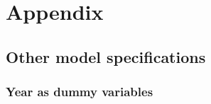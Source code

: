 \documentclass[11pt,]{article}
\begin{document}
\clearpage

\hypertarget{appendix}{%
\section{Appendix}\label{appendix}}

\hypertarget{other-model-specifications}{%
\subsection{Other model
specifications}\label{other-model-specifications}}

\hypertarget{year-as-dummy-variables}{%
\subsubsection{Year as dummy variables}\label{year-as-dummy-variables}}
\end{document}
